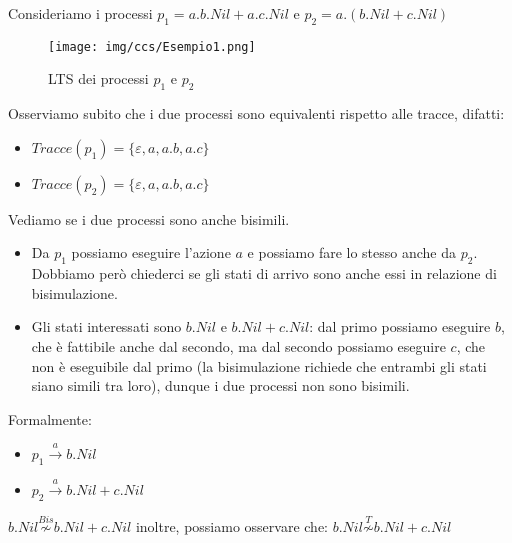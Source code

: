 \begin{esempio}
    Consideriamo i processi $p_1 = a . b . Nil + a . c . Nil$ e
    $p_2 = a . (b . Nil + c . Nil)$
    \begin{figure}[!ht]
        \centering
        \texttt{[image: img/ccs/Esempio1.png]}
        \caption{LTS dei processi $p_1$ e $p_2$}
    \end{figure}
    Osserviamo subito che i due processi sono equivalenti rispetto alle tracce,
    difatti:
    \begin{itemize}
        \item $Tracce(p_1) = \{\varepsilon, a, a . b, a . c\}$
        \item $Tracce(p_2) = \{\varepsilon, a, a . b, a . c\}$
    \end{itemize}
    Vediamo se i due processi sono anche bisimili.
    \begin{itemize}
        \item Da $p_1$ possiamo eseguire l'azione $a$ e possiamo fare lo stesso
              anche da $p_2$. Dobbiamo però chiederci se gli stati di arrivo sono
              anche essi in relazione di bisimulazione.
        \item Gli stati interessati sono $b . Nil$ e $b . Nil + c .
                  Nil$: dal primo possiamo eseguire $b$, che è fattibile anche
              dal secondo, ma dal secondo possiamo eseguire $c$, che non è
              eseguibile dal primo (la bisimulazione richiede che entrambi gli
              stati siano simili tra loro), dunque i due processi non sono bisimili.
    \end{itemize}
    Formalmente:
    \begin{itemize}
        \item $p_1 \xrightarrow{a} b . Nil$
        \item $p_2 \xrightarrow{a} b . Nil + c . Nil$
    \end{itemize}
    $b . Nil \stackrel{Bis}{\not\sim} b . Nil + c . Nil$ inoltre,
    possiamo osservare che: $b . Nil \stackrel{T}{\not\sim} b . Nil + c . Nil$
\end{esempio}
